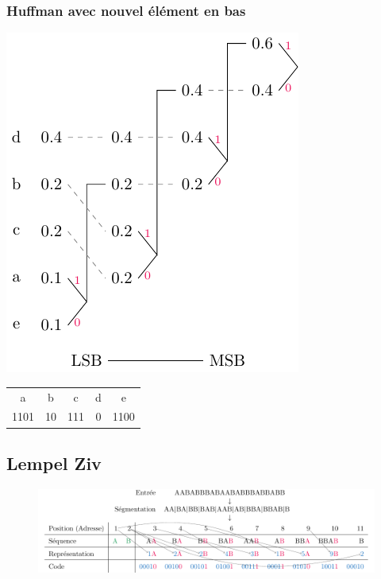 \documentclass[resume]{subfiles}
\begin{document}
\subsubsection{Huffman avec nouvel élément en bas}
\begin{center}
\includegraphics[scale=0.75,page=2]{drwg_4.pdf}\\
\begin{tabular}{ccccc}
a & b & c & d & e\\
1101 & 10 & 111 & 0 & 1100
\end{tabular}
\end{center}



\subsection{Lempel Ziv}
\begin{figure}[H]
\centering
\includegraphics[width=\columnwidth]{drwg_0.pdf}
\end{figure}
\end{document}
